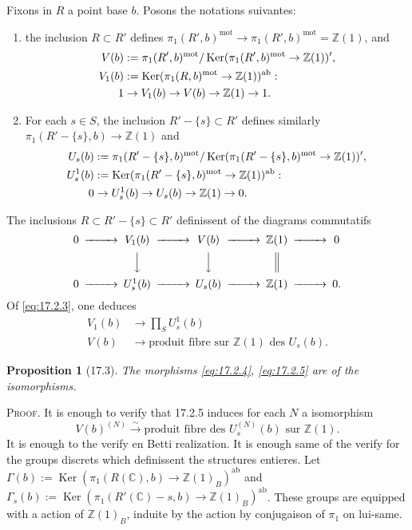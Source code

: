 \documentclass[12pt,a4paper]{article}
\theoremstyle{plain}
\newtheorem{proposition}[theorem]{Proposition}
\theoremstyle{definition}
\theoremstyle{remark}
\DeclareMathOperator{\Ker}{Ker}
\newcommand{\mot}{\mathrm{mot}}
\newcommand{\Betti}{B}
\newcommand{\ZZ}{\mathbb{Z}}
\newcommand{\CC}{\mathbb{C}}
\begin{document}
Fixons in $R$ a point base $b$. Posons the notations suivantes:
\begin{enumerate}
\item[(a)] the inclusion $R \subset R'$ defines
$\pi_1(R',b)^\mot \to \pi_1(R',b)^\mot = \ZZ(1)$, and
\begin{align}
V(b) &:= \pi_1(R',b)^\mot/\Ker(\pi_1(R',b)^\mot \to \ZZ(1))', \notag \\
V_1(b) &:= \Ker(\pi_1(R,b)^\mot \to \ZZ(1))^{\mathrm{ab}}: \notag \\
1 &\to V_1(b) \to V(b) \to \ZZ(1) \to 1. \label{eq:17.2.1}
\end{align}
\item[(b)] For each $s \in S$, the inclusion $R' - \{s\} \subset R'$
defines similarly $\pi_1(R'-\{s\},b) \to \ZZ(1)$ and
\begin{align}
U_s(b) &:= \pi_1(R'-\{s\},b)^\mot/\Ker(\pi_1(R'-\{s\},b)^\mot \to \ZZ(1))', \notag \\
U_s^1(b) &:= \Ker(\pi_1(R'-\{s\},b)^\mot \to \ZZ(1))^{\mathrm{ab}}: \notag \\
0 &\to U_s^1(b) \to U_s(b) \to \ZZ(1) \to 0. \label{eq:17.2.2}
\end{align}
\end{enumerate}
The inclusions $R \subset R' - \{s\} \subset R'$ definissent of the
diagrams commutatifs
\begin{equation}\label{eq:17.2.3}
\begin{CD}
0 @>>> V_1(b) @>>> V(b) @>>> \ZZ(1) @>>> 0 \\
@. @VVV @VVV @| \\
0 @>>> U_s^1(b) @>>> U_s(b) @>>> \ZZ(1) @>>> 0.
\end{CD}
\end{equation}
Of \eqref{eq:17.2.3}, one deduces
\begin{align}
V_1(b) &\to \prod_S U_s^1(b) \label{eq:17.2.4} \\
V(b) &\to \text{produit fibre sur } \ZZ(1) \text{ des } U_s(b). \label{eq:17.2.5}
\end{align}

\begin{proposition}[17.3]\label{prop:17.3}
The morphisms \eqref{eq:17.2.4}, \eqref{eq:17.2.5} are of the
isomorphisms.
\end{proposition}

\noindent \textsc{Proof.} It is enough to verify that 17.2.5 induces
for each $N$ a isomorphism
\begin{equation}\label{eq:17.3.1}
V(b)^{(N)} \xrightarrow{\sim} \text{produit fibre des } U_s^{(N)}(b)
\text{ sur } \ZZ(1).
\end{equation}
It is enough to the verify en Betti realization. It is enough same of the
verify for the groups discrets which definissent the structures
entieres. Let
$\Gamma(b) := \Ker(\pi_1(R(\CC),b) \to \ZZ(1)_\Betti)^{\mathrm{ab}}$ and
$\Gamma_s(b) := \Ker(\pi_1(R'(\CC)-s,b) \to
\ZZ(1)_\Betti)^{\mathrm{ab}}$. These groups are equipped with a action of
$\ZZ(1)_\Betti$, induite by the action by conjugaison of $\pi_1$ on
lui-same.
\end{document}
